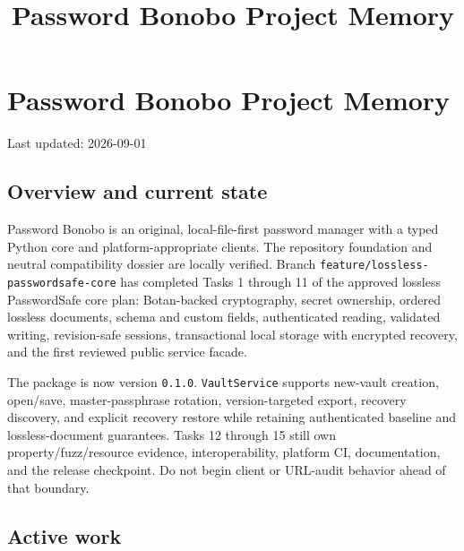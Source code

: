 \documentclass[
  letterpaper,
]{article}
\title{Password Bonobo Project Memory}
\author{}
\date{}
\newcommand{\passthrough}[1]{#1}
\begin{document}
\maketitle

{
\setcounter{tocdepth}{3}
\tableofcontents
}
\section{Password Bonobo Project Memory}\label{password-bonobo-project-memory}

Last updated: 2026-09-01

\subsection{Overview and current state}\label{overview-and-current-state}

Password Bonobo is an original, local-file-first password manager with a typed Python core and platform-appropriate
clients. The repository foundation and neutral compatibility dossier are locally verified. Branch
\nolinkurl{feature/lossless-passwordsafe-core} has completed Tasks 1 through 11 of the approved lossless PasswordSafe
core plan: Botan-backed cryptography, secret ownership, ordered lossless documents, schema and custom fields,
authenticated reading, validated writing, revision-safe sessions, transactional local storage with encrypted recovery,
and the first reviewed public service facade.

The package is now version \passthrough{\lstinline!0.1.0!}. \nolinkurl{VaultService} supports new-vault creation,
open/save, master-passphrase rotation, version-targeted export, recovery discovery, and explicit recovery restore while
retaining authenticated baseline and lossless-document guarantees. Tasks 12 through 15 still own property/fuzz/resource
evidence, interoperability, platform CI, documentation, and the release checkpoint. Do not begin client or URL-audit
behavior ahead of that boundary.

\subsection{Active work}\label{active-work}
\end{document}
